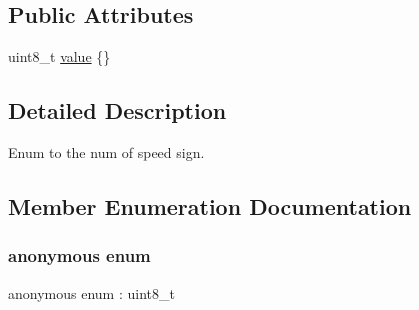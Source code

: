 \subsection*{Public Attributes}
\begin{DoxyCompactItemize}
\item 
uint8\+\_\+t \hyperlink{structmaf__perception__interface_1_1SpeedSignSpeedEnum_accc45a38c91a6dd0d7b362f5ef0ce5ea}{value} \{\}
\end{DoxyCompactItemize}


\subsection{Detailed Description}
Enum to the num of speed sign. 

\subsection{Member Enumeration Documentation}
\mbox{\label{structmaf__perception__interface_1_1SpeedSignSpeedEnum_a63ae45bf82b3896196b87fc6b665caa1}} 
\subsubsection{\texorpdfstring{anonymous enum}{anonymous enum}}
{\footnotesize\ttfamily anonymous enum \+: uint8\+\_\+t}

